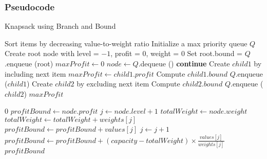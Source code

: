 \subsubsection{Pseudocode}
\begin{algorithm} [H]
    \caption{Knapsack using Branch and Bound}
    \begin{algorithmic}
        \State{} Sort items by decreasing value-to-weight ratio
        \State{} Initialize a max priority queue $Q$
        \State{} Create root node with level = $-1$, profit = $0$, weight = $0$
        \State{} Set root.bound = 
        \State{} $Q$.enqueue (root)
        \State{} $maxProfit \gets 0$
            \State{} $node \gets Q$.dequeue () 
                \State{} \textbf{continue}
            \EndIf{}
            \State{} Create $child1$ by including next item
                \State{} $maxProfit \gets child1.profit$
            \EndIf{}
            \State{} Compute $child1.bound$
                \State{} $Q$.enqueue ($child1$)
            \EndIf{}
            \State{} Create $child2$ by excluding next item
            \State{} Compute $child2.bound$
                \State{} $Q$.enqueue ($child2$)
            \EndIf{}
        \EndWhile{}
        \State{} \Return{}{} $maxProfit$
    \EndFunction{}
    
            \State{} \Return{} $0$
        \EndIf{}
        \State{} $profitBound \gets node.profit$
        \State{} $j \gets node.level + 1$
        \State{} $totalWeight \gets node.weight$
            \State{} $totalWeight \gets totalWeight + weights[j]$
            \State{} $profitBound \gets profitBound + values[j]$
            \State{} $j \gets j + 1$
        \EndWhile{}
            \State{} $profitBound \gets profitBound + (capacity - totalWeight) \times \frac{values[j]}{weights[j]}$
        \EndIf{}
        \State{} \Return{} $profitBound$
    \EndFunction{}
    \end{algorithmic}
\end{algorithm}